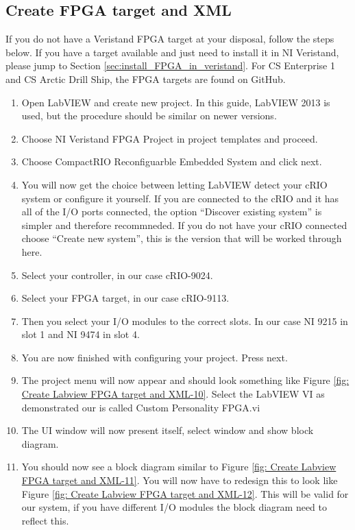\documentclass[a4paper,english]{report}
\begin{document}
\subsection{Create FPGA target and XML}\label{subsec:Create-FPGA-target}
If you do not have a Veristand FPGA target at your disposal, follow the steps below. If you have a target available and just need to install it in NI Veristand, please jump to Section \ref{sec:install_FPGA_in_veristand}. For CS Enterprise 1 and CS Arctic Drill Ship, the FPGA targets are found on GitHub. 
\begin{enumerate}
	\item Open LabVIEW and create new project. In this guide, LabVIEW 2013 is used, but the procedure should be similar on newer versions. 
	\item Choose NI Veristand FPGA Project in project templates and proceed.
	\item Choose CompactRIO Reconfiguarble Embedded System and click next.
	\item You will now get the choice between letting LabVIEW detect your cRIO  system or configure it yourself. If you are connected to the cRIO and it has all of the I/O ports connected, the option ``Discover existing system'' is simpler and therefore recommneded. If you do not have your cRIO connected choose ``Create new system'', this is the version that will be worked through here.
	\item Select your controller, in our case cRIO-9024.
	\item Select your FPGA target, in our case cRIO-9113.
	\item Then you select your I/O modules to the correct slots. In our case NI 9215 in slot 1 and NI 9474 in slot 4.
	\item You are now finished with configuring your project. Press next.
	\item The project menu will now appear and should look something like Figure
	\ref{fig: Create Labview FPGA target and XML-10}. Select the LabVIEW VI as demonstrated our is called Custom Personality FPGA.vi
	\item The UI window will now present itself, select window and show block diagram.
	\item You should now see a block diagram similar to Figure \ref{fig: Create Labview FPGA target and XML-11}. You will now have to redesign this to look like Figure \ref{fig: Create Labview FPGA target and XML-12}. This will be valid for our system, if you have different I/O modules the block diagram need to reflect this.

\end{enumerate}
\end{document}
